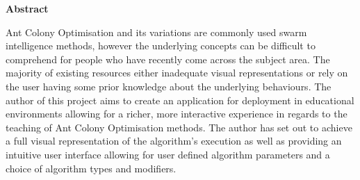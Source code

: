 \thispagestyle{empty}

\begin{center}
    {\LARGE\bf Abstract}
\end{center}
\noident
Ant Colony Optimisation and its variations are commonly used swarm intelligence methods, however the underlying concepts can be difficult to comprehend for people who have recently come across the subject area. The majority of existing resources either inadequate visual representations or rely on the user having some prior knowledge about the underlying behaviours. The author of this project aims to create an application for deployment in educational environments allowing for a richer, more interactive experience in regards to the teaching of Ant Colony Optimisation methods. The author has set out to achieve a full visual representation of the algorithm's execution as well as providing an intuitive user interface allowing for user defined algorithm parameters and a choice of algorithm types and modifiers.

